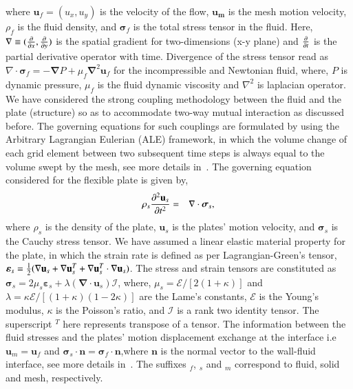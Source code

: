 \documentclass[final,3p,10pt,times,review,authoryear]{elsarticle}
\begin{document}
	where $\mathbf{u}_f=(u_x,u_y)$ is the velocity of the flow, $\mathbf{u_m}$ is the mesh motion velocity, $\rho_f$ is the fluid density, and $\boldsymbol{\sigma}_f$ is the total stress tensor in the fluid. Here, $\mathbf{\nabla}\equiv ({\partial\over\partial x},{\partial\over\partial y})$ is the spatial gradient for two-dimensions (x-y plane) and ${\partial\over\partial t}$ is the partial derivative operator with time.	Divergence of the stress tensor read as $\nabla\cdot\boldsymbol{\sigma}_f=-\mathbf{\nabla}P+\mu_f\mathbf{\nabla}^2\mathbf{u}_f$ for the incompressible and Newtonian fluid, where, $P$ is dynamic pressure, $\mu_f$ is the fluid dynamic viscosity and $\nabla^2$ is laplacian operator. We have considered the strong coupling methodology between the fluid and the plate (structure) so as to accommodate two-way mutual interaction as discussed before. The governing equations for such couplings are formulated by using the Arbitrary Lagrangian Eulerian (ALE) framework, in which the volume change of each grid element between two subsequent time steps is always equal to the volume swept by the mesh, see more details in~\citep{Nguyen2010, Slone2002, CampbellPaterson2011}.  %
	The governing equation considered for the flexible plate is given by,	
	\begin{eqnarray}
		\rho_s{\partial^2\mathbf{u}_s\over\partial t^2} &=& \mathbf{\nabla}\cdot\mathbf{\boldsymbol{\sigma}}_s,
	\end{eqnarray}
	where $\rho_s$ is the density of the plate, $\mathbf{u}_s$ is the plates' motion velocity, and $\mathbf{\boldsymbol{\sigma}}_s$ is the Cauchy stress tensor. We have assumed a linear elastic material property for the plate, in which the strain rate is defined as per Lagrangian-Green's tensor, $\boldsymbol{\varepsilon}_s={1\over2}(\mathbf{\nabla}\mathbf{u}_s+\mathbf{\nabla}\mathbf{u}_s^T+\mathbf{\nabla}\mathbf{u}_s^T \cdot \mathbf{\nabla}\mathbf{u}_s)$. The stress and strain tensors are constituted as $\boldsymbol{\sigma}_s=2\mu_s \boldsymbol{\varepsilon}_s+\lambda( \mathbf{\nabla}\cdot\mathbf{u}_s)\mathcal{I}$, where, $\mu_s=\mathcal{E}/[2(1+\kappa)]$ and $\lambda=\kappa \mathcal{E}/[(1+\kappa)(1-2\kappa)]$ are the Lame's constants, $\mathcal{E}$ is the Young's modulus, $\kappa$ is the Poisson's ratio,  and $\mathcal{I}$ is a rank two identity tensor. The superscript $^T$ here represents transpose of a tensor. The information between the fluid stresses and the plates' motion displacement exchange at the interface i.e $\mathbf{u}_m=\mathbf{u}_f$ and $\boldsymbol{\sigma}_s\cdot\mathbf{n}=\boldsymbol{\sigma}_f\cdot\mathbf{n}$,where $\mathbf{n}$ is the normal vector to the wall-fluid interface, see more details in~\citep{CasadeiHalleux1995, Casadei2001}. The suffixes $_f$, $_s$ and $_m$ correspond to fluid, solid and mesh, respectively.
\end{document}
